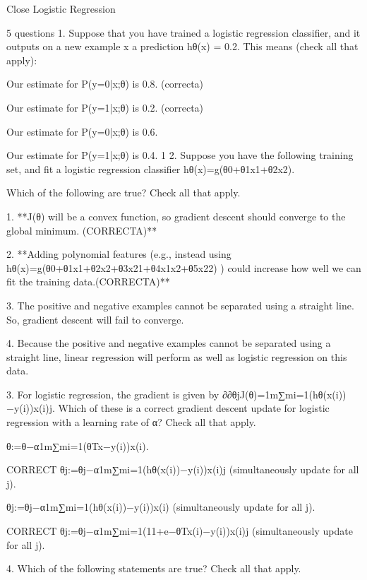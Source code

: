 Close
Logistic Regression

5 questions
1. 
Suppose that you have trained a logistic regression classifier, and it outputs on a new example x a prediction hθ(x) = 0.2. This means (check all that apply):

Our estimate for P(y=0|x;θ) is 0.8. (correcta)

Our estimate for P(y=1|x;θ) is 0.2.  (correcta)

Our estimate for P(y=0|x;θ) is 0.6.

Our estimate for P(y=1|x;θ) is 0.4.
1
2. 
Suppose you have the following training set, and fit a logistic regression classifier hθ(x)=g(θ0+θ1x1+θ2x2).

Which of the following are true? Check all that apply.

1. **J(θ) will be a convex function, so gradient descent should converge to the global minimum. (CORRECTA)**

2. **Adding polynomial features (e.g., instead using hθ(x)=g(θ0+θ1x1+θ2x2+θ3x21+θ4x1x2+θ5x22) ) could increase how well we can fit the training data.(CORRECTA)**

3. The positive and negative examples cannot be separated using a straight line. So, gradient descent will fail to converge.

4. Because the positive and negative examples cannot be separated using a straight line, linear regression will perform as well as logistic regression on this data.

3. 
For logistic regression, the gradient is given by ∂∂θjJ(θ)=1m∑mi=1(hθ(x(i))−y(i))x(i)j. Which of these is a correct gradient descent update for logistic regression with a learning rate of α? Check all that apply.



θ:=θ−α1m∑mi=1(θTx−y(i))x(i).


CORRECT θj:=θj−α1m∑mi=1(hθ(x(i))−y(i))x(i)j (simultaneously update for all j).
 
θj:=θj−α1m∑mi=1(hθ(x(i))−y(i))x(i) (simultaneously update for all j).

CORRECT θj:=θj−α1m∑mi=1(11+e−θTx(i)−y(i))x(i)j (simultaneously update for all j).


4. 
Which of the following statements are true? Check all that apply.

